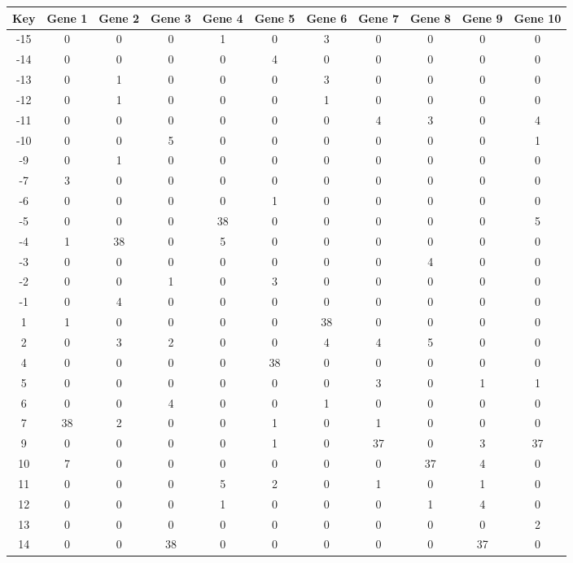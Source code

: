 \begin{tabular}{|c|c|c|c|c|c|c|c|c|c|c|}
\hline
Key & Gene 1 & Gene 2 & Gene 3 & Gene 4 & Gene 5 & Gene 6 & Gene 7 & Gene 8 & Gene 9 & Gene 10 \\
\hline
-15 & 0 & 0 & 0 & 1 & 0 & 3 & 0 & 0 & 0 & 0 \\
-14 & 0 & 0 & 0 & 0 & 4 & 0 & 0 & 0 & 0 & 0 \\
-13 & 0 & 1 & 0 & 0 & 0 & 3 & 0 & 0 & 0 & 0 \\
-12 & 0 & 1 & 0 & 0 & 0 & 1 & 0 & 0 & 0 & 0 \\
-11 & 0 & 0 & 0 & 0 & 0 & 0 & 4 & 3 & 0 & 4 \\
-10 & 0 & 0 & 5 & 0 & 0 & 0 & 0 & 0 & 0 & 1 \\
-9 & 0 & 1 & 0 & 0 & 0 & 0 & 0 & 0 & 0 & 0 \\
-7 & 3 & 0 & 0 & 0 & 0 & 0 & 0 & 0 & 0 & 0 \\
-6 & 0 & 0 & 0 & 0 & 1 & 0 & 0 & 0 & 0 & 0 \\
-5 & 0 & 0 & 0 & 38 & 0 & 0 & 0 & 0 & 0 & 5 \\
-4 & 1 & 38 & 0 & 5 & 0 & 0 & 0 & 0 & 0 & 0 \\
-3 & 0 & 0 & 0 & 0 & 0 & 0 & 0 & 4 & 0 & 0 \\
-2 & 0 & 0 & 1 & 0 & 3 & 0 & 0 & 0 & 0 & 0 \\
-1 & 0 & 4 & 0 & 0 & 0 & 0 & 0 & 0 & 0 & 0 \\
1 & 1 & 0 & 0 & 0 & 0 & 38 & 0 & 0 & 0 & 0 \\
2 & 0 & 3 & 2 & 0 & 0 & 4 & 4 & 5 & 0 & 0 \\
4 & 0 & 0 & 0 & 0 & 38 & 0 & 0 & 0 & 0 & 0 \\
5 & 0 & 0 & 0 & 0 & 0 & 0 & 3 & 0 & 1 & 1 \\
6 & 0 & 0 & 4 & 0 & 0 & 1 & 0 & 0 & 0 & 0 \\
7 & 38 & 2 & 0 & 0 & 1 & 0 & 1 & 0 & 0 & 0 \\
9 & 0 & 0 & 0 & 0 & 1 & 0 & 37 & 0 & 3 & 37 \\
10 & 7 & 0 & 0 & 0 & 0 & 0 & 0 & 37 & 4 & 0 \\
11 & 0 & 0 & 0 & 5 & 2 & 0 & 1 & 0 & 1 & 0 \\
12 & 0 & 0 & 0 & 1 & 0 & 0 & 0 & 1 & 4 & 0 \\
13 & 0 & 0 & 0 & 0 & 0 & 0 & 0 & 0 & 0 & 2 \\
14 & 0 & 0 & 38 & 0 & 0 & 0 & 0 & 0 & 37 & 0 \\
\hline
\end{tabular}